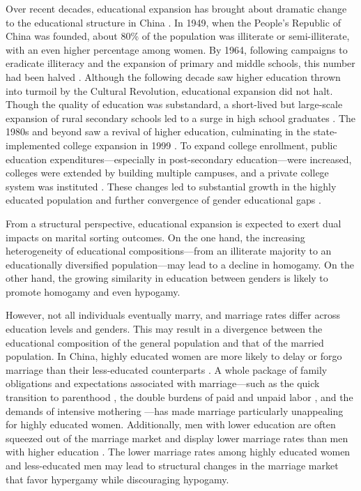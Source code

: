 Over recent decades, educational expansion has brought about dramatic change to the educational structure in China \parencite{yeungHigherEducationExpansion2013}. In 1949, when the People's Republic of China was founded, about 80\% of the population was illiterate or semi-illiterate, with an even higher percentage among women. By 1964, following campaigns to eradicate illiteracy and the expansion of primary and middle schools, this number had been halved \parencite{treimanTrendsEducationalAttainment2013}. Although the following decade saw higher education thrown into turmoil by the Cultural Revolution, educational expansion did not halt. Though the quality of education was substandard, a short-lived but large-scale expansion of rural secondary schools led to a surge in high school graduates \parencite{sicularBigExpansionRural2022}. The 1980s and beyond saw a revival of higher education, culminating in the state-implemented college expansion in 1999 \parencite{treimanTrendsEducationalAttainment2013}.  To expand college enrollment, public education expenditures—especially in post-secondary education—were increased, colleges were extended by building multiple campuses, and a private college system was instituted \parencite{yeungHigherEducationExpansion2013}. These changes led to substantial growth in the highly educated population and further convergence of gender educational gaps \parencite{treimanTrendsEducationalAttainment2013}.

From a structural perspective, educational expansion is expected to exert dual impacts on marital sorting outcomes. On the one hand, the increasing heterogeneity of educational compositions—from an illiterate majority to an educationally diversified population—may lead to a decline in homogamy. On the other hand, the growing similarity in education between genders is likely to promote homogamy and even hypogamy.

However, not all individuals eventually marry, and marriage rates differ across education levels and genders. This may result in a divergence between the educational composition of the general population and that of the married population. In China, highly educated women are more likely to delay or forgo marriage than their less-educated counterparts \parencite{huGenderEducationExpansion2023,jiTraditionModernityLeftover2015}. A whole package of family obligations and expectations associated with marriage—such as the quick transition to parenthood \parencite{tongResistantChangeTransition2017}, the double burdens of paid and unpaid labor \parencite{luoGenderDivisionHousehold2018}, and the demands of intensive mothering \parencite{guWhyChineseAdolescent2021,guSacrificeIndebtednessIntergenerational2022}—has made marriage particularly unappealing for highly educated women. Additionally, men with lower education are often squeezed out of the marriage market and display lower marriage rates than men with higher education \parencite{jiangMarriageSqueezeNeverMarried2014}. The lower marriage rates among highly educated women and less-educated men may lead to structural changes in the marriage market that favor hypergamy while discouraging hypogamy.

